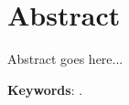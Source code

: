 \documentclass[bookType,partialBuild]{../ThesisClass/ThesisClass}
\begin{document}
\fi
\ifdefined \bookType
	\cleardoublepage
\fi



\chapter*{Abstract}

\vspace{-0.2cm}


Abstract goes here...

\vspace{0.7cm}

\ifdefined \ThesisKeywords
\noindent \textbf{Keywords}: \ThesisKeywords.
\fi



\ifdefined \partialBuild
	
\end{document}
